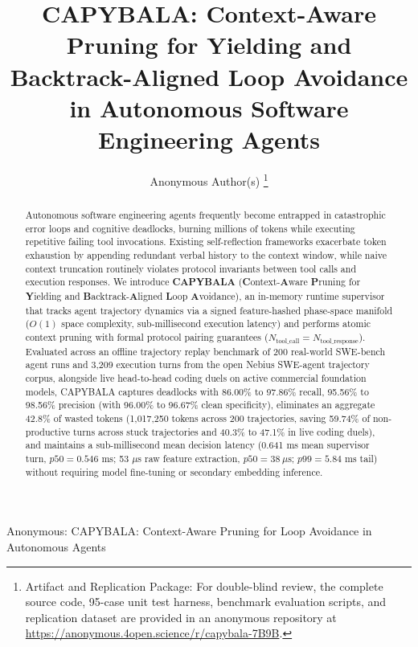 \documentclass[journal]{IEEEtran}
\begin{document}
\flushbottom

\title{CAPYBALA: Context-Aware Pruning for Yielding and Backtrack-Aligned Loop Avoidance in Autonomous Software Engineering Agents}

\author{Anonymous Author(s)%
\thanks{Artifact and Replication Package: For double-blind review, the complete source code, 95-case unit test harness, benchmark evaluation scripts, and replication dataset are provided in an anonymous repository at \url{https://anonymous.4open.science/r/capybala-7B9B}.}%
}

%
{Anonymous: CAPYBALA: Context-Aware Pruning for Loop Avoidance in Autonomous Agents}

\maketitle

\begin{abstract}
Autonomous software engineering agents frequently become entrapped in catastrophic error loops and cognitive deadlocks, burning millions of tokens while executing repetitive failing tool invocations. Existing self-reflection frameworks exacerbate token exhaustion by appending redundant verbal history to the context window, while naive context truncation routinely violates protocol invariants between tool calls and execution responses. We introduce \textbf{CAPYBALA} (\textbf{C}ontext-\textbf{A}ware \textbf{P}runing for \textbf{Y}ielding and \textbf{B}acktrack-\textbf{A}ligned \textbf{L}oop \textbf{A}voidance), an in-memory runtime supervisor that tracks agent trajectory dynamics via a signed feature-hashed phase-space manifold ($O(1)$ space complexity, sub-millisecond execution latency) and performs atomic context pruning with formal protocol pairing guarantees ($N_{\text{tool\_call}} = N_{\text{tool\_response}}$). Evaluated across an offline trajectory replay benchmark of 200 real-world SWE-bench agent runs and 3,209 execution turns from the open Nebius SWE-agent trajectory corpus, alongside live head-to-head coding duels on active commercial foundation models, CAPYBALA captures deadlocks with 86.00\% to 97.86\% recall, 95.56\% to 98.56\% precision (with 96.00\% to 96.67\% clean specificity), eliminates an aggregate 42.8\% of wasted tokens (1,017,250 tokens across 200 trajectories, saving 59.74\% of non-productive turns across stuck trajectories and 40.3\% to 47.1\% in live coding duels), and maintains a sub-millisecond mean decision latency (0.641 ms mean supervisor turn, $p50 = 0.546\text{ ms}$; 53 $\mu$s raw feature extraction, $p50 = 38\ \mu\text{s}$; $p99 = 5.84\text{ ms}$ tail) without requiring model fine-tuning or secondary embedding inference.
\end{abstract}
\end{document}
